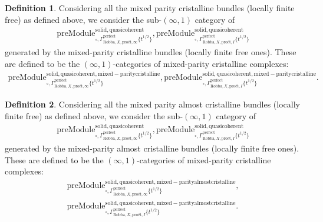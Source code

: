 \documentclass[12pt]{book}
\theoremstyle{definition}
\newtheorem{definition}{Definition}
\begin{document}
\begin{definition}
Considering all the mixed parity cristalline bundles (locally finite free) as defined above, we consider the sub-$(\infty,1)$ category of 
\begin{align}
\mathrm{preModule}^\mathrm{solid,quasicoherent}_{\square,\Gamma^\mathrm{perfect}_{\text{Robba},X,\text{pro\'et},\infty}\{t^{1/2}\}},
\mathrm{preModule}^\mathrm{solid,quasicoherent}_{\square,\Gamma^\mathrm{perfect}_{\text{Robba},X,\text{pro\'et},I}\{t^{1/2}\}} 
\end{align}
generated by the mixed-parity cristalline bundles (locally finite free ones). These are defined to be the $(\infty,1)$-categories of mixed-parity cristalline complexes:
\begin{align}
\mathrm{preModule}^\mathrm{solid,quasicoherent,mixed-paritycristalline}_{\square,\Gamma^\mathrm{perfect}_{\text{Robba},X,\text{pro\'et},\infty}\{t^{1/2}\}},
\mathrm{preModule}^\mathrm{solid,quasicoherent,mixed-paritycristalline}_{\square,\Gamma^\mathrm{perfect}_{\text{Robba},X,\text{pro\'et},I}\{t^{1/2}\}}. 
\end{align}
\end{definition}


\begin{definition}
Considering all the mixed parity almost cristalline bundles (locally finite free) as defined above, we consider the sub-$(\infty,1)$ category of 
\begin{align}
\mathrm{preModule}^\mathrm{solid,quasicoherent}_{\square,\Gamma^\mathrm{perfect}_{\text{Robba},X,\text{pro\'et},\infty}\{t^{1/2}\}},
\mathrm{preModule}^\mathrm{solid,quasicoherent}_{\square,\Gamma^\mathrm{perfect}_{\text{Robba},X,\text{pro\'et},I}\{t^{1/2}\}} 
\end{align}
generated by the mixed-parity almost cristalline bundles (locally finite free ones). These are defined to be the $(\infty,1)$-categories of mixed-parity cristalline complexes:
\begin{align}
\mathrm{preModule}^\mathrm{solid,quasicoherent,mixed-parityalmostcristalline}_{\square,\Gamma^\mathrm{perfect}_{\text{Robba},X,\text{pro\'et},\infty}\{t^{1/2}\}},\\
\mathrm{preModule}^\mathrm{solid,quasicoherent,mixed-parityalmostcristalline}_{\square,\Gamma^\mathrm{perfect}_{\text{Robba},X,\text{pro\'et},I}\{t^{1/2}\}}. 
\end{align}
\end{definition}
\end{document}
